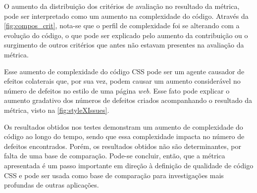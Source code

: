 O aumento da distribuição dos critérios de avaliação no resultado da métrica, pode ser interpretado como um aumento na complexidade do código.  Através da \autoref{fig:compos_crit}, nota-se que o perfil de complexidade foi se alterando com a evolução do código, o que pode ser explicado pelo aumento da contribuição ou o surgimento de outros critérios que antes não estavam presentes na avaliação da métrica.

Esse aumento de complexidade do código CSS pode ser um agente causador de efeitos colaterais que, por sua vez, podem causar um aumento considerável no número de defeitos no estilo de uma página \textit{web}. Esse fato pode explicar o aumento gradativo dos números de defeitos criados acompanhando o resultado da métrica, visto na \autoref{fig:styleXIssues}.

Os resultados obtidos nos testes demonstram um aumento de complexidade do código ao longo do tempo, sendo que essa complexidade impacta no número de defeitos encontrados. Porém, os resultados obtidos não são determinantes, por falta de uma base de comparação. Pode-se concluir, então, que a métrica apresentada é um passo importante em direção à definição de qualidade de código CSS e pode ser usada como base de comparação para investigações mais profundas de outras aplicações.